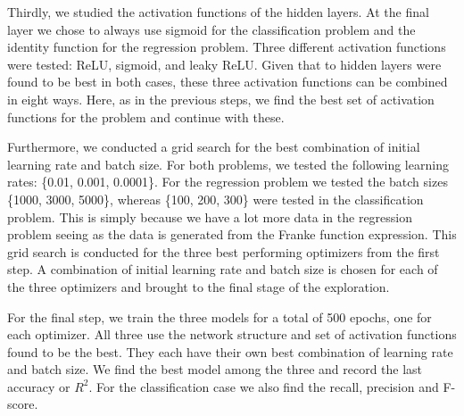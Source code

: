 Thirdly, we studied the activation functions of the hidden layers. At the final layer we chose to always use sigmoid for the classification problem and the identity function for the regression problem. 
Three different activation functions were tested: ReLU, sigmoid, and leaky ReLU. Given that to hidden layers were found to be best in both cases, these three activation functions can be combined in eight ways. Here, as in the previous steps, we find the best set of activation functions for the problem and continue with these. 

Furthermore, we conducted a grid search for the best combination of initial learning rate and batch size. For both problems, we tested the following learning rates: \{0.01, 0.001, 0.0001\}. 
For the regression problem we tested the batch sizes \{1000, 3000, 5000\}, whereas \{100, 200, 300\} were tested in the classification problem. 
This is simply because we have a lot more data in the regression problem seeing as the data is generated from the Franke function expression. This grid search is conducted for the three best performing optimizers from the first step. 
A combination of initial learning rate and batch size is chosen for each of the three optimizers and brought to the final stage of the exploration. 

For the final step, we train the three models for a total of 500 epochs, one for each optimizer. All three use the network structure and set of activation functions found to be the best. They each have their own best combination of learning rate and batch size. 
We find the best model among the three and record the last accuracy or $R^2$. For the classification case we also find the recall, precision and F-score. 